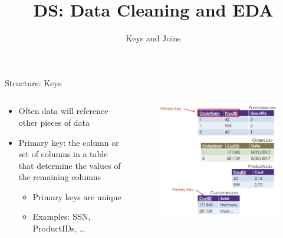\documentclass[aspectratio=169]{../latex_main/tntbeamer}  %
\title[Introduction]{DS: Data Cleaning and EDA}
\subtitle{Keys and Joins}
\begin{document}
	
	\maketitle
	
	
	\begin{frame}{Structure: Keys}

	 \begin{columns}
	   
	   
	   \begin{column}{.4\textwidth}
	    \begin{itemize}
	        \item Often data will reference other pieces of data
	        \item Primary key: the column or set of columns in a table that determine the values of the remaining columns
	        \begin{itemize}
	            \item Primary keys are unique
	            \item Examples: SSN, ProductIDs, …
	        \end{itemize}
	    \end{itemize}
		\end{column}
		
	   \begin{column}{.6\textwidth}
	   \begin{figure}
	       		    \includegraphics[scale=.28]{Bild14}
	   \end{figure}

		\end{column}
		\end{columns}
	\end{frame}
	
\end{document}

